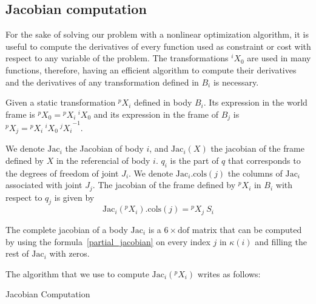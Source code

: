 \subsection{Jacobian computation}
\label{sub:jacobian_computation}


For the sake of solving our problem with a nonlinear optimization algorithm, it is useful to compute the derivatives of every function used as constraint or cost with respect to any variable of the problem.
The transformations ${}^i X_0$ are used in many functions, therefore, having an efficient algorithm to compute their derivatives and the derivatives of any transformation defined in $B_i$ is necessary.

Given a static transformation ${}^p X_i$ defined in body $B_i$.
Its expression in the world frame is ${}^p X_0 = {}^p X_i\ {}^i X_0$ and its expression in the frame of $B_j$ is ${}^p X_j = {}^p X_i\ {}^i X_0\ {{}^j X_i}^{-1}$.

We denote $\text{Jac}_i$ the Jacobian of body $i$, and $\text{Jac}_i(X)$ the jacobian of the frame defined by $X$ in the referencial of body $i$.
$q_i$ is the part of $q$ that corresponds to the degrees of freedom of joint $J_i$.
We denote $\text{Jac}_i.\text{cols}(j)$ the columns of $\text{Jac}_i$ associated with joint $J_j$.
The jacobian of the frame defined by ${}^p X_i$ in $B_i$ with respect to $q_j$ is given by
\begin{equation}
\label{partial_jacobian}
  \text{Jac}_i({}^p X_i).\text{cols}(j) = {}^p X_j\ S_i
\end{equation}

The complete jacobian of a body $\text{Jac}_i$ is a $6\times \text{dof}$ matrix that can be computed by using the formula~\ref{partial_jacobian} on every index $j$ in $\kappa(i)$ and filling the rest of $\text{Jac}_i$ with zeros.

The algorithm that we use to compute $\text{Jac}_i({}{}^p X_i)$ writes as follows:

\begin{algorithm}
  \caption{Jacobian Computation}
\label{alg:jacobian_computation}
\begin{algorithmic}
  \EndFor{}
\end{algorithmic}
\end{algorithm}

